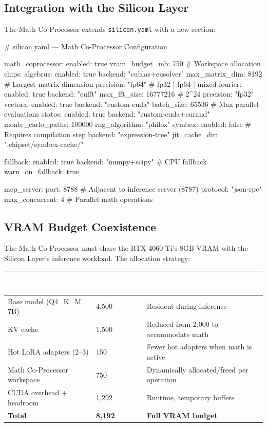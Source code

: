 \documentclass[11pt,letterpaper]{article}
\newcommand{\tableheader}[1]{\textbf{\sffamily\textcolor{white}{#1}}}
\begin{document}
\subsection{Integration with the Silicon Layer}

The Math Co-Processor extends \texttt{silicon.yaml} with a new section:

\begin{asciibox}
# silicon.yaml — Math Co-Processor Configuration

math_coprocessor:
  enabled: true
  vram_budget_mb: 750          # Workspace allocation
  chips:
    algebrus:
      enabled: true
      backend: "cublas+cusolver"
      max_matrix_dim: 8192     # Largest matrix dimension
      precision: "fp64"        # fp32 | fp64 | mixed
    fourier:
      enabled: true
      backend: "cufft"
      max_fft_size: 16777216   # 2^24
      precision: "fp32"
    vectora:
      enabled: true
      backend: "custom-cuda"
      batch_size: 65536        # Max parallel evaluations
    statos:
      enabled: true
      backend: "custom-cuda+curand"
      monte_carlo_paths: 100000
      rng_algorithm: "philox"
    symbex:
      enabled: false           # Requires compilation step
      backend: "expression-tree"
      jit_cache_dir: ".chipset/symbex-cache/"

  fallback:
    enabled: true
    backend: "numpy+scipy"     # CPU fallback
    warn_on_fallback: true

  mcp_server:
    port: 8788                 # Adjacent to inference server (8787)
    protocol: "json-rpc"
    max_concurrent: 4          # Parallel math operations
\end{asciibox}

\subsection{VRAM Budget Coexistence}

The Math Co-Processor must share the RTX 4060 Ti's 8GB VRAM with the Silicon Layer's inference workload. The allocation strategy:

\begin{center}
\begin{tabularx}{\textwidth}{L{4.5cm}C{2.5cm}X}
\toprule
{}
\tableheader{Component} & \tableheader{VRAM (MB)} & \tableheader{Notes} \\
\midrule
Base model (Q4\_K\_M 7B) & 4,500 & Resident during inference \\
KV cache & 1,500 & Reduced from 2,000 to accommodate math \\
Hot LoRA adapters (2--3) & 150 & Fewer hot adapters when math is active \\
Math Co-Processor workspace & 750 & Dynamically allocated/freed per operation \\
CUDA overhead + headroom & 1,292 & Runtime, temporary buffers \\
\midrule
\textbf{Total} & \textbf{8,192} & \textbf{Full VRAM budget} \\
\bottomrule
\end{tabularx}
\end{center}
\end{document}
